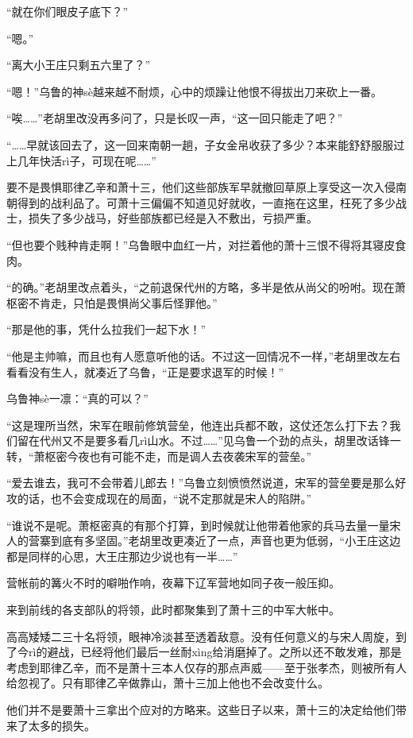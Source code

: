 “就在你们眼皮子底下？”

“嗯。”

“离大小王庄只剩五六里了？”

“嗯！”乌鲁的神sè越来越不耐烦，心中的烦躁让他恨不得拔出刀来砍上一番。

“唉……”老胡里改没再多问了，只是长叹一声，“这一回只能走了吧？”

“……早就该回去了，这一回来南朝一趟，子女金帛收获了多少？本来能舒舒服服过上几年快活rì子，可现在呢……”

要不是畏惧耶律乙辛和萧十三，他们这些部族军早就撤回草原上享受这一次入侵南朝得到的战利品了。可萧十三偏偏不知道见好就收，一直拖在这里，枉死了多少战士，损失了多少战马，好些部族都已经是入不敷出，亏损严重。

“但也要个贱种肯走啊！”乌鲁眼中血红一片，对拦着他的萧十三恨不得将其寝皮食肉。

“的确。”老胡里改点着头，“之前退保代州的方略，多半是依从尚父的吩咐。现在萧枢密不肯走，只怕是畏惧尚父事后怪罪他。”

“那是他的事，凭什么拉我们一起下水！”

“他是主帅嘛，而且也有人愿意听他的话。不过这一回情况不一样，”老胡里改左右看看没有生人，就凑近了乌鲁，“正是要求退军的时候！”

乌鲁神sè一凛：“真的可以？”

“这是理所当然，宋军在眼前修筑营垒，他连出兵都不敢，这仗还怎么打下去？我们留在代州又不是要多看几rì山水。不过……”见乌鲁一个劲的点头，胡里改话锋一转，“萧枢密今夜也有可能不走，而是调人去夜袭宋军的营垒。”

“爱去谁去，我可不会带着儿郎去！”乌鲁立刻愤愤然说道，宋军的营垒要是那么好攻的话，也不会变成现在的局面，“说不定那就是宋人的陷阱。”

“谁说不是呢。萧枢密真的有那个打算，到时候就让他带着他家的兵马去量一量宋人的营寨到底有多坚固。”老胡里改更凑近了一点，声音也更为低弱，“小王庄这边都是同样的心思，大王庄那边少说也有一半……”

营帐前的篝火不时的噼啪作响，夜幕下辽军营地如同子夜一般压抑。

来到前线的各支部队的将领，此时都聚集到了萧十三的中军大帐中。

高高矮矮二三十名将领，眼神冷淡甚至透着敌意。没有任何意义的与宋人周旋，到了今rì的避战，已经将他们最后一丝耐xìng给消磨掉了。之所以还不敢发难，那是考虑到耶律乙辛，而不是萧十三本人仅存的那点声威——至于张孝杰，则被所有人给忽视了。只有耶律乙辛做靠山，萧十三加上他也不会改变什么。

他们并不是要萧十三拿出个应对的方略来。这些日子以来，萧十三的决定给他们带来了太多的损失。

